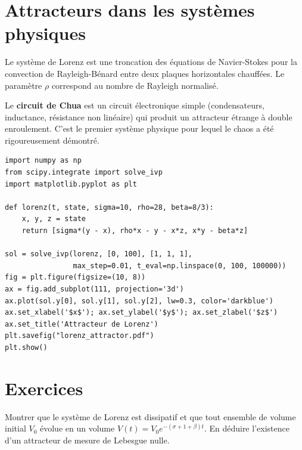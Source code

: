 \section{Attracteurs dans les syst\`emes physiques}

\begin{exemple}
Le syst\`eme de Lorenz est une troncation des \'equations de
Navier-Stokes pour la convection de Rayleigh-B\'enard entre deux plaques
horizontales chauff\'ees. Le param\`etre $\rho$ correspond au nombre de
Rayleigh normalis\'e.
\end{exemple}

\begin{exemple}
Le \textbf{circuit de Chua} est un circuit \'electronique simple
(condensateurs, inductance, r\'esistance non lin\'eaire) qui produit un
attracteur \'etrange \`a double enroulement. C'est le premier syst\`eme
physique pour lequel le chaos a \'et\'e rigoureusement d\'emontr\'e.
\end{exemple}

\begin{codeblock}[title=\textbf{Visualisation de l'attracteur de Lorenz}]
\begin{verbatim}
import numpy as np
from scipy.integrate import solve_ivp
import matplotlib.pyplot as plt

def lorenz(t, state, sigma=10, rho=28, beta=8/3):
    x, y, z = state
    return [sigma*(y - x), rho*x - y - x*z, x*y - beta*z]

sol = solve_ivp(lorenz, [0, 100], [1, 1, 1],
                max_step=0.01, t_eval=np.linspace(0, 100, 100000))
fig = plt.figure(figsize=(10, 8))
ax = fig.add_subplot(111, projection='3d')
ax.plot(sol.y[0], sol.y[1], sol.y[2], lw=0.3, color='darkblue')
ax.set_xlabel('$x$'); ax.set_ylabel('$y$'); ax.set_zlabel('$z$')
ax.set_title('Attracteur de Lorenz')
plt.savefig("lorenz_attractor.pdf")
plt.show()
\end{verbatim}
\end{codeblock}

\section{Exercices}

\begin{exercice}[Dissipativit\'e]
Montrer que le syst\`eme de Lorenz est dissipatif et que tout ensemble de
volume initial $V_0$ \'evolue en un volume $V(t) = V_0 e^{-(\sigma + 1 + \beta)t}$.
En d\'eduire l'existence d'un attracteur de mesure de Lebesgue nulle.
\end{exercice}

